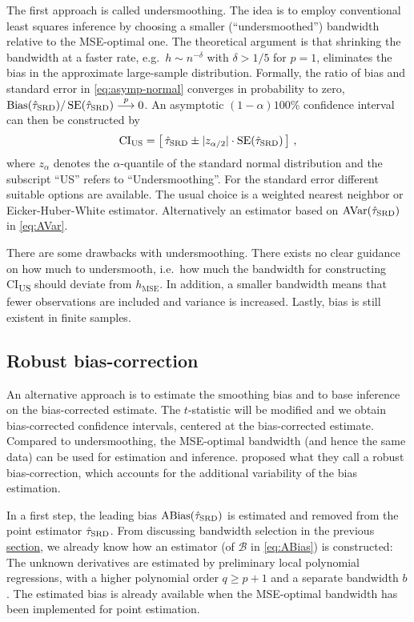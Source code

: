 The first approach is called undersmoothing.
The idea is to employ conventional least squares inference by choosing a smaller (\enquote{undersmoothed}) bandwidth relative to the MSE-optimal one.
The theoretical argument is that shrinking the bandwidth at a faster rate, e.g.\ $h \sim n^{-\delta}$ with $\delta > 1/5$ for $p=1$, 
eliminates the bias in the approximate large-sample distribution.
Formally, the ratio of bias and standard error in \eqref{eq:asymp-normal} converges in probability to zero, $\operatorname{Bias}(\hat{\tau}_{\textup{SRD}}) / \operatorname{SE}(\hat{\tau}_{\textup{SRD}}) \overset{p}{\longrightarrow} 0$. 
An asymptotic $(1-\alpha)100\%$ confidence interval can then be constructed by 
\begin{equation}
	\text{CI}_{\text{US}} = \left[\, \hat{\tau}_{\textup{SRD}} \pm |z_{\alpha/2}| \cdot \operatorname{SE}(\hat{\tau}_{\textup{SRD}}) \,\right] \,,  
\end{equation}  
where $z_{\alpha}$ denotes the $\alpha$-quantile of the standard normal distribution and the subscript \enquote{US} refers to 
\enquote{Undersmoothing}.
For the standard error different suitable options are available.
The usual choice is a weighted nearest neighbor or Eicker-Huber-White estimator.
Alternatively an estimator based on $\operatorname{AVar}(\hat{\tau}_{\textup{SRD}})$ in \eqref{eq:AVar}.

There are some drawbacks with undersmoothing.
There exists no clear guidance on how much to undersmooth,
i.e.\ how much the bandwidth for constructing CI\textsubscript{US} should deviate from $h_{\text{MSE}}$.
In addition, a smaller bandwidth means that fewer observations are included and variance is increased.
Lastly, bias is still existent in finite samples.

\subsection{Robust bias-correction}

An alternative approach is to estimate the smoothing bias and to base inference on the bias-corrected estimate.
The $t$-statistic will be modified and we obtain bias-corrected confidence intervals, centered at the bias-corrected estimate.
Compared to undersmoothing, the MSE-optimal bandwidth (and hence the same data) can be used for estimation and inference.  
\textcite{Calonico_2014} proposed what they call a robust bias-correction, which accounts for the additional variability of the bias estimation.

In a first step, the leading bias $\operatorname{ABias}(\hat{\tau}_{\textup{SRD}})$ is estimated and removed from the point estimator $\hat{\tau}_{\textup{SRD}}$.
From discussing bandwidth selection in the previous \hyperref[sec:estimation]{section}, we already know how an estimator (of $\mathcal{B}$ in \eqref{eq:ABias}) is constructed:
The unknown derivatives are estimated by preliminary local polynomial regressions, with a higher polynomial order $q \geq p+1$ and a separate bandwidth $b$.
The estimated bias is already available when the MSE-optimal bandwidth has been implemented for point estimation.

